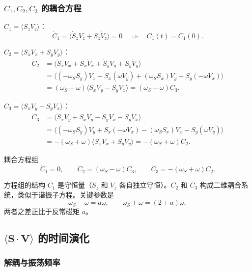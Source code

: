 \subsubsection{$C_1, C_2, C_3$ 的耦合方程}

\textbf{$C_1=\langle S_zV_z\rangle$}：
\[
  \dot C_1 = \langle\dot S_z V_z + S_z\dot V_z\rangle = 0
  \quad\Longrightarrow\quad \boxed{C_1(t)=C_1(0)}.
\]

\textbf{$C_2=\langle S_xV_x+S_yV_y\rangle$}：
\begin{align*}
  \dot C_2
  &= \langle\dot S_xV_x+S_x\dot V_x+\dot S_yV_y+S_y\dot V_y\rangle \\
  &= \langle(-\omega_S S_y)V_x+S_x(\omega V_y)+(\omega_S S_x)V_y+S_y(-\omega V_x)\rangle \\
  &= (\omega_S-\omega)\langle S_xV_y-S_yV_x\rangle
   = (\omega_S-\omega)C_3.
\end{align*}

\textbf{$C_3=\langle S_xV_y-S_yV_x\rangle$}：
\begin{align*}
  \dot C_3
  &= \langle\dot S_xV_y+S_x\dot V_y-\dot S_yV_x-S_y\dot V_x\rangle \\
  &= \langle(-\omega_S S_y)V_y+S_x(-\omega V_x)-(\omega_S S_x)V_x-S_y(\omega V_y)\rangle \\
  &= -(\omega_S+\omega)\langle S_xV_x+S_yV_y\rangle
   = -(\omega_S+\omega)C_2.
\end{align*}

\begin{formulabox}{耦合方程组}
\[
  \boxed{\dot C_1=0},\qquad
  \boxed{\dot C_2=(\omega_S-\omega)C_3},\qquad
  \boxed{\dot C_3=-(\omega_S+\omega)C_2}.
\]
\end{formulabox}

\begin{thinkbox}{方程组的结构}
$C_1$ 是守恒量（$S_z$ 和 $V_z$ 各自独立守恒）。$C_2$ 和 $C_3$ 构成二维耦合系统，类似于谐振子方程。关键参数是
\[
  \omega_S-\omega = a\omega,\qquad \omega_S+\omega = (2+a)\omega,
\]
两者之差正比于反常磁矩 $a$。
\end{thinkbox}


\subsection{$\langle\bm S\cdot\bm V\rangle$ 的时间演化}

\subsubsection{解耦与振荡频率}

